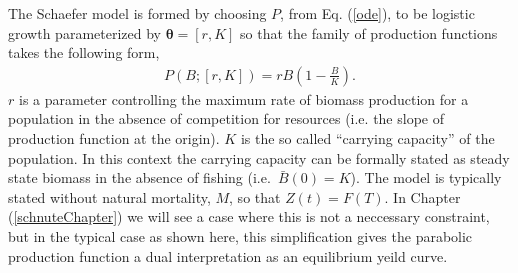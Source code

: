 %
The Schaefer model is formed by choosing $P$, from Eq. (\ref{ode}), to be logistic 
growth \cite{mangel_theoretical_2006} parameterized by $\bm{\theta} = [r, K]$ 
so that the family of production functions takes the following form,
%
\begin{align}
P(B; [r, K]) = r B \left(1-\frac{B}{K}\right). \label{logistic}
\end{align}
$r$ is a parameter controlling the maximum rate of biomass production for a 
population in the absence of competition for resources (i.e. the slope of 
production function at the origin). $K$ is the so called ``carrying capacity''
of the population. In this context the carrying capacity can be formally 
stated as steady state biomass in the absence of fishing \mbox{(i.e. $\bar B(0)=K$).} 
The model is typically stated without natural mortality, $M$, so that $Z(t)=F(T)$. 
In Chapter (\ref{schnuteChapter}) we will see a case where this is not a 
neccessary constraint, but in the typical case as shown here, this simplification 
gives the parabolic production function a dual interpretation as an equilibrium 
yeild curve.  

